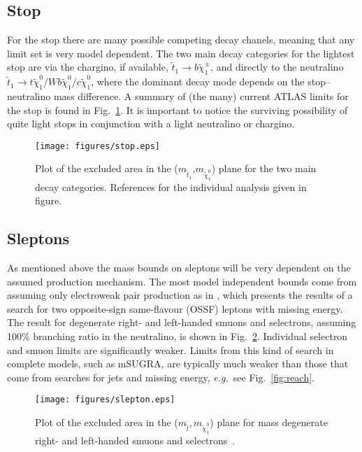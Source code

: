 \documentclass[notes.tex]{subfiles}
\begin{document}
\subsection{Stop}
For the stop there are many possible competing decay chanels, meaning that any limit set is very model dependent. The two main decay categories for the lightest stop are via the chargino, if available, $\tilde{t}_1\to b \tilde{\chi}^\pm_1$, and directly to the neutralino $\tilde{t}_1\to t\tilde{\chi}^0_1/ Wb \tilde{\chi}^0_1/ c\tilde{\chi}^0_1$, where the dominant decay mode depends on the stop--neutralino mass difference. A summary of (the many) current ATLAS limits for the stop is found in Fig.~\ref{fig:stop}. It is important to notice the surviving possibility of quite light stops in conjunction with a light neutralino or chargino.

\begin{figure}[h!]
\begin{center}
\texttt{[image: figures/stop.eps]} 
\caption{Plot of the excluded area in the ($m_{\tilde{t}_1}$,$m_{\tilde{\chi}^0_1}$) plane for the two main decay categories. References for the individual analysis given in figure.\label{fig:stop}}
\end{center}
\end{figure}

\subsection{Sleptons}
As mentioned above the mass bounds on sleptons will be very dependent on the assumed production mechanism. The most model independent bounds come from assuming only electroweak pair production as in \cite{ATLAS-CONF-2013-049}, which presents the results of a search for two opposite-sign same-flavour (OSSF) leptons with missing energy. The result for degenerate right- and left-handed smuons and selectrons, assuming 100\% branching ratio in the neutralino, is shown in Fig.~\ref{fig:slepton}. Individual selectron and smuon limits are significantly weaker. Limits from this kind of search in complete models, such as mSUGRA, are typically much weaker than those that come from searches for jets and missing energy, {\it e.g.}\ see Fig.~\ref{fig:reach}.

\begin{figure}[h!]
\begin{center}
\texttt{[image: figures/slepton.eps]} 
\caption{Plot of the excluded area in the ($m_{\tilde l}$,\,$m_{\tilde{\chi}^0_1}$) plane for mass degenerate right- and left-handed smuons and selectrons~\cite{ATLAS-CONF-2013-049}.\label{fig:slepton}}
\end{center}
\end{figure}
\end{document}
